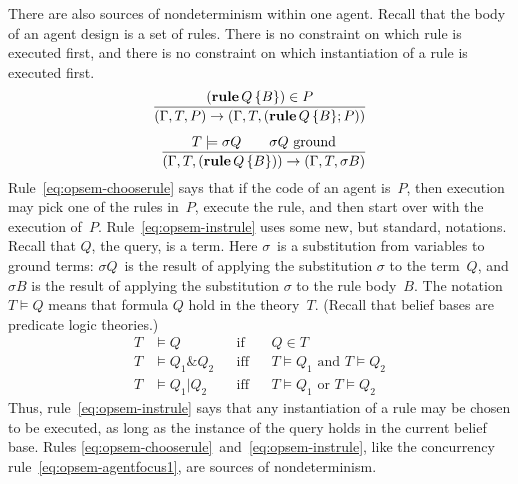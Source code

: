 \documentclass[a4paper,12pt,oneside,fleqn]{book} %
\begin{document}
There are also sources of nondeterminism within one agent. Recall that the
body of an agent design is a set of rules. There is no constraint on which
rule is executed first, and there is no constraint on which instantiation of
a rule is executed first.
\begin{align}
\frac
  {({\bf rule}\,Q\,\{B\}) \in P}
  {(\Gamma,T,P)\to(\Gamma,T,({\bf rule}\,Q\,\{B\};P))}
  \label{eq:opsem-chooserule}
\\[1ex]
\frac
  {T \models \sigma Q \qquad\text{$\sigma Q$ ground}}
  {(\Gamma,T,({\bf rule}\,Q\,\{B\}))\to(\Gamma,T,\sigma B)}
  \label{eq:opsem-instrule}
\end{align}
Rule~\eqref{eq:opsem-chooserule} says that if the code of an agent is~$P$,
then execution may pick one of the rules in~$P$, execute the rule, and then
start over with the execution of~$P$. Rule~\eqref{eq:opsem-instrule} uses
some new, but standard, notations. Recall that $Q$, the query, is a term.
Here $\sigma$~is a substitution from variables to ground terms: $\sigma
Q$~is the result of applying the substitution $\sigma$ to the term~$Q$, and
$\sigma B$ is the result of applying the substitution $\sigma$ to the rule
body~$B$. The notation $T\models Q$ means that formula $Q$ hold in the
theory~$T$. (Recall that belief bases are predicate logic theories.)
\begin{align}
T &\models Q  &&\text{if} && Q\in T \\
T &\models Q_1\&Q_2 &&\text{iff} &&\text{$T\models Q_1$ and $T\models Q_2$}\\
T &\models Q_1|Q_2 &&\text{iff} &&\text{$T\models Q_1$ or $T\models Q_2$}
\end{align}
Thus, rule~\eqref{eq:opsem-instrule} says that any instantiation of a rule
may be chosen to be executed, as long as the instance of the query holds in
the current belief base. Rules
\eqref{eq:opsem-chooserule}~and~\eqref{eq:opsem-instrule}, like the
concurrency rule~\eqref{eq:opsem-agentfocus1}, are sources of
nondeterminism.
\end{document}
